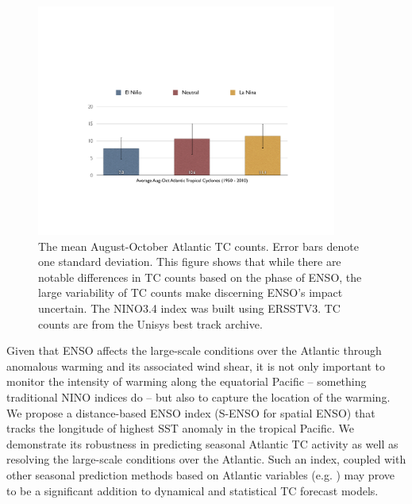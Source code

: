 

 





\begin{figure}[htbp]
	\centering
		\includegraphics[height=3in]{figures/nino_tc_bars.pdf}
	\caption{The mean August-October Atlantic TC counts. Error bars denote one standard deviation. This figure shows that while there are notable differences in TC counts based on the phase of ENSO, the large variability of TC counts make discerning ENSO's impact uncertain. The NINO3.4 index was built using ERSSTV3. TC counts are from the Unisys best track archive.}
	\label{fig:figures_nino_tc_bars}
\end{figure}

Given that ENSO affects the large-scale conditions over the Atlantic through anomalous warming and its associated wind shear, it is not only important to monitor the intensity of warming along the equatorial Pacific -- something traditional NINO indices do -- but also to capture the location of the warming. We propose a distance-based ENSO index (S-ENSO for spatial ENSO) that tracks the longitude of highest SST anomaly in the tropical Pacific. We demonstrate its robustness in predicting seasonal Atlantic TC activity as well as resolving the large-scale conditions over the Atlantic. Such an index, coupled with other seasonal prediction methods based on Atlantic variables (e.g. \cite{knutson2007, emanuel2008simulation}) may prove to be a significant addition to dynamical and statistical TC forecast models.

